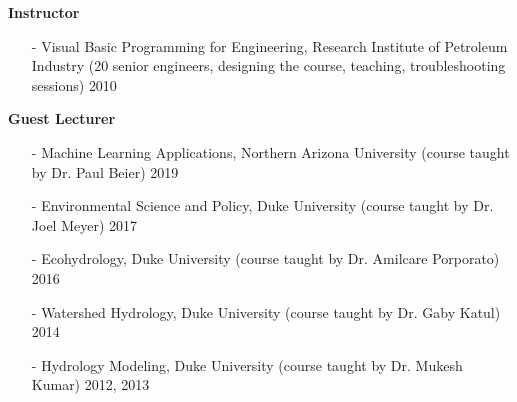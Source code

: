 \documentclass[10pt]{article}
\newenvironment{changemargin}[2]{%
  \begin{list}{}{%
 \setlength{\topsep}{0pt}%
 \setlength{\leftmargin}{#1}%
 \setlength{\rightmargin}{#2}%
 \setlength{\listparindent}{\parindent}%
 \setlength{\itemindent}{\parindent}%
 \setlength{\parsep}{\parskip}%
  }%
  \item[]}{\end{list}
}
\newenvironment{body} {
  \vspace*{-2pt}
  \begin{changemargin}{-0.5in}{-0.5in}
}
{\end{changemargin}
}
\begin{document}
\begin{body}
  \textbf {Instructor}\\
  \vspace*{-4pt}
  \begin{itemize} \itemsep -0pt
    \item[-]Visual Basic Programming for Engineering, Research Institute of Petroleum Industry (20 senior engineers, designing the course, teaching,  troubleshooting sessions)  \hfill {2010}
  \end{itemize}
  \medskip

  \textbf {Guest Lecturer}\\
  \vspace*{-4pt}
  \begin{itemize} \itemsep -0pt
    \item[-]Machine Learning Applications, Northern Arizona University  (course taught by Dr. Paul Beier) \hfill {2019}
    \item[-]Environmental Science and Policy, Duke University (course taught by Dr. Joel Meyer)  \hfill {2017}
    \item[-]Ecohydrology, Duke University (course taught by Dr. Amilcare Porporato)  \hfill {2016}
    \item[-]Watershed Hydrology, Duke University (course taught by Dr. Gaby Katul)  \hfill {2014}
    \item[-]Hydrology Modeling, Duke University (course taught by Dr. Mukesh Kumar)  \hfill {2012, 2013}
  \end{itemize}
  \medskip



\end{body}
\end{document}
